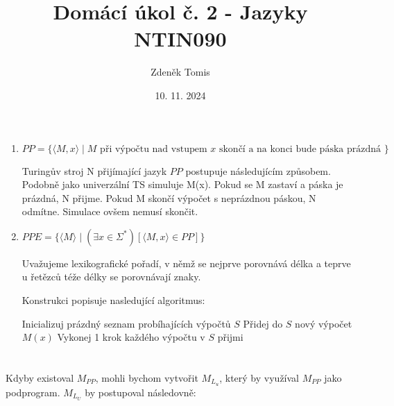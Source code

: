 \documentclass{article}
\title{%
    Domácí úkol č. 2 - Jazyky \\
    NTIN090
}
\author{Zdeněk Tomis}
\date{10. 11. 2024}
\begin{document}
\maketitle


\section{}

\begin{enumerate}[label=\alph*)]
    \item 
    \( PP = \{ \langle M, x \rangle \mid M \text{ při výpočtu nad vstupem } x \text{ skončí a na konci bude páska prázdná } \} \)

    Turingův stroj N přijímající jazyk $PP$ postupuje následujícím způsobem. Podobně jako univerzální TS simuluje M(x). Pokud se M zastaví a páska je prázdná, N přijme. Pokud M skončí výpočet s neprázdnou páskou, N odmítne. Simulace ovšem nemusí skončit.
    \item 
        \( PPE = \{ \langle M \rangle \mid (\exists x \in \Sigma^*)[ \langle M, x \rangle \in PP ] \} \)    


        
        Uvažujeme lexikografické pořadí, v němž se nejprve porovnává délka a teprve u řetězců téže délky se porovnávají znaky.

        Konstrukci popisuje nasledující algoritmus:

        \begin{algorithm}
            \caption{}
            \begin{algorithmic}[1]
                \State Inicializuj prázdný seznam probíhajících výpočtů \( S \)
                    \State Přidej do \( S \) nový výpočet \( M(x) \)
                    \State Vykonej 1 krok každého výpočtu v \( S \)
                        \State přijmi
                    \EndIf
                \EndFor
            \end{algorithmic}
            \end{algorithm}
            
\end{enumerate}

\section{}

Kdyby existoval $M_{PP}$, mohli bychom vytvořit $M_{L_u}$, který by využíval $M_{PP}$ jako podprogram. $M_{L_U}$ by postupoval následovně:
\end{document}

